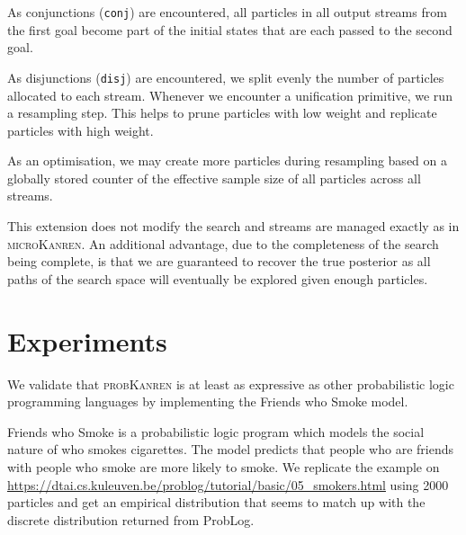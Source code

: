\documentclass[
]{ceurart}
\begin{document}
As conjunctions (\texttt{conj}) are encountered, all particles in all
output streams from the first goal become part of the initial states
that are each passed to the second goal.

As disjunctions (\texttt{disj}) are encountered, we split evenly the
number of particles allocated to each stream. Whenever we encounter a
unification primitive, we run a resampling step. This helps to prune
particles with low weight and replicate particles with high weight.

As an optimisation, we may create more particles during resampling
based on a globally stored counter of the effective sample size of
all particles across all streams.

This extension does not modify the search and streams are managed
exactly as in \textsc{microKanren}. An additional advantage, due to
the completeness of the  search being complete, is
that we are guaranteed to recover the true posterior as all paths of
the search space will eventually be explored given enough particles.

\section{Experiments}

We validate that \textsc{probKanren} is at least as expressive as other probabilistic
logic programming languages by implementing the Friends who Smoke model.

Friends who Smoke is a probabilistic logic program which models the
social nature of who smokes cigarettes. The model predicts that people
who are friends with people who smoke are more likely to smoke. We
replicate the example on
\url{https://dtai.cs.kuleuven.be/problog/tutorial/basic/05_smokers.html}
using 2000 particles and get an empirical distribution that seems to
match up with the discrete distribution returned from ProbLog.



\end{document}
